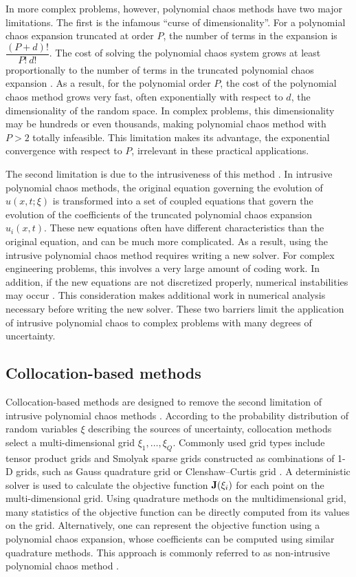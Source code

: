 In more complex problems,
however, polynomial chaos methods have two major limitations.  The first
is the infamous ``curse of dimensionality''.  
For a polynomial chaos expansion truncated at order $P$, the number of terms
in the expansion is $\dfrac{(P+d)!}{P!\:d!}$.  The cost of solving the
polynomial chaos system grows at least proportionally to the number of terms in
the truncated polynomial chaos expansion \cite[]{polychaos4}.
As a result, for the polynomial
order $P$, the cost of the polynomial chaos method
grows very fast, often exponentially with respect to $d$, the dimensionality
of the random space.  In complex problems, this dimensionality 
may be hundreds or even thousands, making polynomial chaos method with $P>2$
totally infeasible.  This limitation makes its advantage, the exponential
convergence with respect to $P$, irrelevant in these practical applications.

The second limitation is due to the intrusiveness of this method
\cite[]{polychaos5}.
In intrusive polynomial chaos methods, the original equation governing the
evolution of $u(x,t;\xi)$ is transformed into a set of coupled
equations that govern the evolution of the coefficients of the truncated
polynomial chaos expansion $u_i(x,t)$.  These new equations often have
different characteristics than the original equation, and can be much more
complicated.  As a result, using the intrusive polynomial chaos method requires
writing a new solver.  For complex engineering problems, this involves a very
large amount of coding work.  In addition, if the new equations are not
discretized properly, numerical instabilities may occur \cite[]{polychaos6}.
This consideration
makes additional work in numerical analysis necessary before writing the new
solver.  These two barriers limit the application of intrusive polynomial
chaos to complex problems with many degrees of uncertainty.

\subsection{Collocation-based methods}
Collocation-based methods are designed to remove the second
limitation of intrusive polynomial chaos methods \cite[]{collocation}.
According to the
probability distribution of random variables $\xi$ describing the sources of
uncertainty, collocation methods select a
multi-dimensional grid $\xi_1,\ldots,\xi_Q$.  Commonly used grid types include
tensor product grids and Smolyak sparse grids constructed as combinations
of 1-D grids, such as Gauss quadrature grid or Clenshaw--Curtis grid
\cite[]{collocation2}.  A deterministic
solver is used to calculate the objective function ${\bf J}(\xi_i)$
for each point on
the multi-dimensional grid.  Using quadrature methods on the
multidimensional grid, many statistics of the objective function can be
directly computed from its values on the grid.
Alternatively, one can represent the objective function using a polynomial
chaos expansion, whose coefficients can be computed using similar quadrature
methods.  This approach is commonly referred to as non-intrusive polynomial
chaos method \cite[]{polychaos5}.

